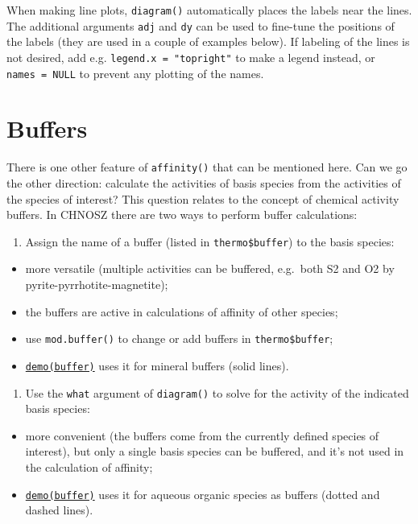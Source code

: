 \documentclass[]{tufte-book}
\providecommand{\tightlist}{%
  \setlength{\itemsep}{0pt}\setlength{\parskip}{0pt}}
\begin{document}
When making line plots, {\texttt{diagram()}} automatically places the
labels near the lines. The additional arguments \texttt{adj} and
\texttt{dy} can be used to fine-tune the positions of the labels (they
are used in a couple of examples below). If labeling of the lines is not
desired, add e.g. \texttt{legend.x\ =\ "topright"} to make a legend
instead, or \texttt{names\ =\ NULL} to prevent any plotting of the
names.

\section{Buffers}\label{buffers}

There is one other feature of {\texttt{affinity()}} that can be
mentioned here. Can we go the other direction: calculate the activities
of basis species from the activities of the species of interest? This
question relates to the concept of chemical activity buffers. In CHNOSZ
there are two ways to perform buffer calculations:

\begin{enumerate}
\def\labelenumi{\arabic{enumi}.}
\tightlist
\item
  Assign the name of a buffer (listed in \texttt{thermo\$buffer}) to the
  basis species:
\end{enumerate}

\begin{itemize}
\tightlist
\item
  more versatile (multiple activities can be buffered, e.g.~both S2 and
  O2 by pyrite-pyrrhotite-magnetite);
\item
  the buffers are active in calculations of affinity of other species;
\item
  use {\texttt{mod.buffer()}} to change or add buffers in
  \texttt{thermo\$buffer};
\item
  \href{../demo}{{\texttt{demo(buffer)}}} uses it for mineral buffers
  (solid lines).
\end{itemize}

\begin{enumerate}
\def\labelenumi{\arabic{enumi}.}
\setcounter{enumi}{1}
\tightlist
\item
  Use the \texttt{what} argument of {\texttt{diagram()}} to solve for
  the activity of the indicated basis species:
\end{enumerate}

\begin{itemize}
\tightlist
\item
  more convenient (the buffers come from the currently defined species
  of interest), but only a single basis species can be buffered, and
  it's not used in the calculation of affinity;
\item
  \href{../demo}{{\texttt{demo(buffer)}}} uses it for aqueous organic
  species as buffers (dotted and dashed lines).
\end{itemize}
\end{document}
